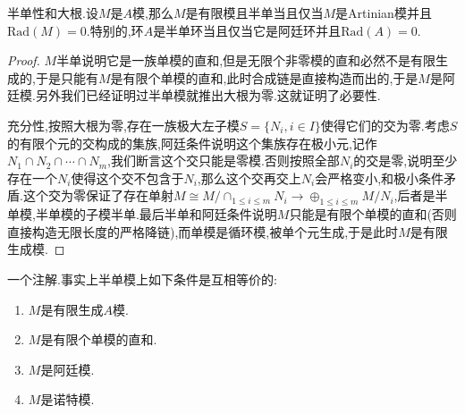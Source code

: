 半单性和大根.设$M$是$A$模,那么$M$是有限模且半单当且仅当$M$是Artinian模并且$\mathrm{Rad}(M)=0$.特别的,环$A$是半单环当且仅当它是阿廷环并且$\mathrm{Rad}(A)=0$.
\begin{proof}
	
	$M$半单说明它是一族单模的直和,但是无限个非零模的直和必然不是有限生成的,于是只能有$M$是有限个单模的直和,此时合成链是直接构造而出的,于是$M$是阿廷模.另外我们已经证明过半单模就推出大根为零.这就证明了必要性.
	
	充分性,按照大根为零,存在一族极大左子模$S=\{N_i,i\in I\}$使得它们的交为零.考虑$S$的有限个元的交构成的集族,阿廷条件说明这个集族存在极小元,记作$N_1\cap N_2\cap\cdots\cap N_m$,我们断言这个交只能是零模.否则按照全部$N_i$的交是零,说明至少存在一个$N_i$使得这个交不包含于$N_i$,那么这个交再交上$N_i$会严格变小,和极小条件矛盾.这个交为零保证了存在单射$M\cong M/\cap_{1\le i\le m}N_i\to\oplus_{1\le i\le m}M/N_i$,后者是半单模,半单模的子模半单.最后半单和阿廷条件说明$M$只能是有限个单模的直和(否则直接构造无限长度的严格降链),而单模是循环模,被单个元生成,于是此时$M$是有限生成模.
\end{proof}

一个注解.事实上半单模上如下条件是互相等价的:
\begin{enumerate}
	\item $M$是有限生成$A$模.
	\item $M$是有限个单模的直和.
	\item $M$是阿廷模.
	\item $M$是诺特模.
\end{enumerate}

